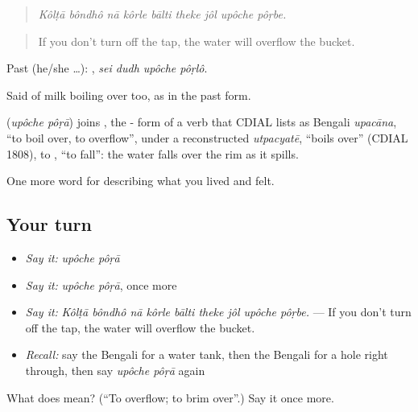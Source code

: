 \begin{quote}
        
\end{quote}

\begin{quote}
\emph{Kôlṭā bôndhô nā kôrle bālti theke jôl upôche pôṛbe.}
\end{quote}

\begin{quote}
If you don't turn off the tap, the water will overflow the bucket.
\end{quote}

Past (he/she …):    , \emph{sei dudh upôche pôṛlô}.

Said of milk boiling over too, as in the past form.

\begin{cousinweb}
\textbf{ } (\emph{upôche pôṛā}) joins , the - form of a verb that CDIAL lists as Bengali \emph{upacāna}, \textquotedblleft{}to boil over, to overflow\textquotedblright{}, under a reconstructed \emph{utpacyatē}, \textquotedblleft{}boils over\textquotedblright{} (CDIAL 1808), to , \textquotedblleft{}to fall\textquotedblright{}: the water falls over the rim as it spills.
\end{cousinweb}

\begin{grammarlens}[title={What you've built}]
One more word for describing what you lived and felt.
\end{grammarlens}

\subsection*{Your turn}
\begin{itemize}
\raggedright
  \item \emph{Say it:} \emph{upôche pôṛā}
  \item \emph{Say it:} \emph{upôche pôṛā}, once more
  \item \emph{Say it:} \emph{Kôlṭā bôndhô nā kôrle bālti theke jôl upôche pôṛbe.} — If you don't turn off the tap, the water will overflow the bucket.
  \item \emph{Recall:} say the Bengali for a water tank, then the Bengali for a hole right through, then say \emph{upôche pôṛā} again
\end{itemize}

\begin{tcolorbox}[breakable,colback=teal!4,colframe=teal!35!black,title={Before you move on}]
What does   mean? (\textquotedblleft{}To overflow; to brim over\textquotedblright{}.) Say it once more.
\end{tcolorbox}
